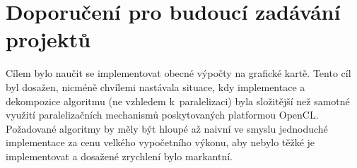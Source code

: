 \documentclass[11pt,a4paper]{article}
\begin{document}
\section{Doporučení pro budoucí zadávání projektů}
Cílem bylo naučit se implementovat obecné výpočty na grafické kartě. Tento cíl byl dosažen, nicméně chvílemi nastávala situace, kdy implementace a dekompozice algoritmu (ne vzhledem k~paralelizaci) byla složitější než samotné využití paralelizačních mechanismů poskytovaných platformou OpenCL. Požadované algoritmy by měly být hloupé až naivní ve smyslu jednoduché implementace za cenu velkého vypočetního výkonu, aby nebylo těžké je implementovat a dosažené zrychlení bylo markantní.
\end{document}

